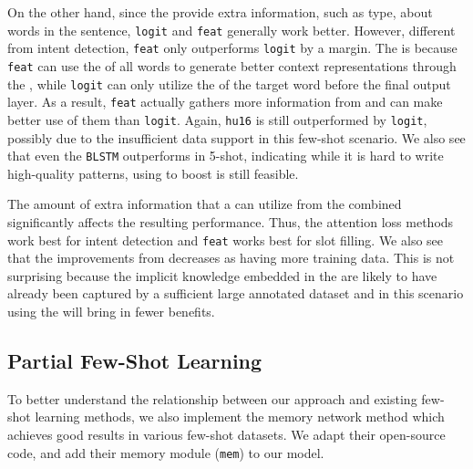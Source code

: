 On the other hand, since the \REtags provide extra information, such as type, about words in the sentence, \texttt{logit} and \texttt{feat}
generally work better. However, different from intent detection, \texttt{feat} only outperforms \texttt{logit} by a margin. The is because
\texttt{feat} can use the \REtags of all words to generate better context representations through the \NN, while \texttt{logit} can only
utilize the \REtag of the target word before the final output layer. As a result, \texttt{feat} actually gathers more information from \REs
and can make better use of them than \texttt{logit}. Again, \texttt{hu16} is still outperformed by \texttt{logit}, possibly due to the
insufficient data support in this few-shot scenario. We also see that even the \texttt{BLSTM} outperforms \REO in 5-shot, indicating while
it is hard to write high-quality \RE patterns, using \REs to boost \NNs is still feasible.


 The amount of extra information that a \NN can utilize from the combined \REs significantly affects the resulting
performance. Thus, the attention loss methods work best for intent detection and \texttt{feat} works best for slot filling. We also see
that the improvements from \REs decreases as having more training data. This is not surprising because the implicit knowledge embedded in
the \REs are likely to have already been captured by a sufficient large annotated dataset and in this scenario using the \REs will bring in
fewer benefits.

\subsection{Partial Few-Shot Learning}
To better understand the relationship between our approach and existing few-shot learning methods, we also implement the memory network
method \cite{kaiser2017learning} which achieves good results in various few-shot datasets. We adapt their open-source code, and add their
memory module (\texttt{mem}) to our \BLSTM model.

